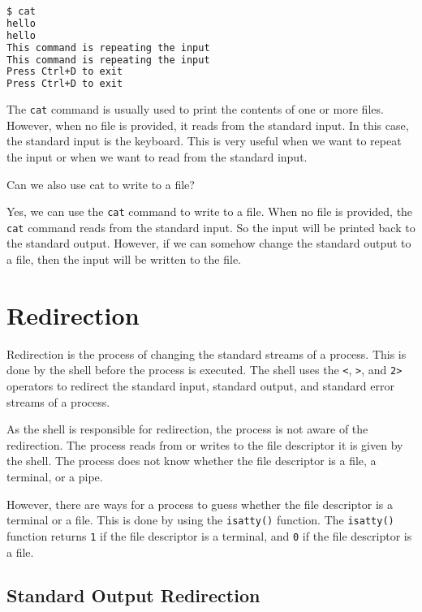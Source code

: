 \begin{lstlisting}[language=bash]
$ cat
hello
hello
This command is repeating the input
This command is repeating the input
Press Ctrl+D to exit
Press Ctrl+D to exit
\end{lstlisting}

The \texttt{cat} command is usually used to print the contents of one
or more files. However, when no file is provided, it reads from the
standard input. In this case, the standard input is the keyboard.
This is very useful when we want to repeat the input or when we want
to read from the standard input.

\begin{qs}
  Can we also use cat to write to a file?
\end{qs}

\begin{ans}
  Yes, we can use the \texttt{cat} command to write to a file. When
  no file is provided, the \texttt{cat} command reads from the standard
  input. So the input will be printed back to the standard output.
  However, if we can somehow change the standard output to a file,
  then the input will be written to the file.
\end{ans}

\section{Redirection}

Redirection is the process of changing the standard streams of a process.
This is done by the shell before the process is executed. The shell
uses the \texttt{<}, \texttt{>}, and \texttt{2>} operators to redirect
the standard input, standard output, and standard error streams of a
process.

As the shell is responsible for redirection, the process is not aware
of the redirection. The process reads from or writes to the file descriptor
it is given by the shell. The process does not know whether the file
descriptor is a file, a terminal, or a pipe.

However, there are ways for a process to guess whether the file descriptor
is a terminal or a file. This is done by using the \texttt{isatty()}
function. The \texttt{isatty()} function returns \texttt{1} if the file
descriptor is a terminal, and \texttt{0} if the file descriptor is a file.

\subsection{Standard Output Redirection}

